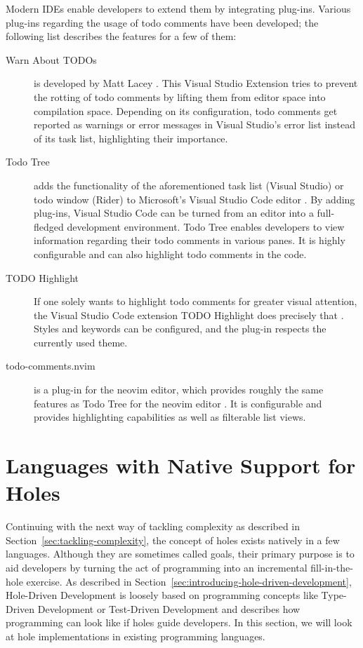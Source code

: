 Modern IDEs enable developers to extend them by integrating plug-ins.
Various plug-ins regarding the usage of todo comments have been developed; the following list describes the features for a few of them:
\begin{description}
  \item[Warn About TODOs] is developed by Matt Lacey \cite{lacey_warn_2023}. This Visual Studio Extension tries to prevent the rotting of todo comments by lifting them from editor space into compilation space. Depending on its configuration, todo comments get reported as warnings or error messages in Visual Studio's error list instead of its task list, highlighting their importance.
  \item[Todo Tree] adds the functionality of the aforementioned task list (Visual Studio) or todo window (Rider) to Microsoft's Visual Studio Code editor \cite{scott_todo_2017}. By adding plug-ins, Visual Studio Code can be turned from an editor into a full-fledged development environment. Todo Tree enables developers to view information regarding their todo comments in various panes. It is highly configurable and can also highlight todo comments in the code.
  \item[TODO Highlight] If one solely wants to highlight todo comments for greater visual attention, the Visual Studio Code extension TODO Highlight does precisely that \cite{wayou_vscode_2016}. Styles and keywords can be configured, and the plug-in respects the currently used theme.
  \item[todo-comments.nvim] is a plug-in for the neovim editor, which provides roughly the same features as Todo Tree for the neovim editor \cite{lemaitre_todo_2021}. It is configurable and provides highlighting capabilities as well as filterable list views.
\end{description}


\section{Languages with Native Support for Holes}
\label{sec:languages-with-native-holes-support}
Continuing with the next way of tackling complexity as described in Section~\ref{sec:tackling-complexity}, the concept of holes exists natively in a few languages.
Although they are sometimes called goals, their primary purpose is to aid developers by turning the act of programming into an incremental fill-in-the-hole exercise.
As described in Section~\ref{sec:introducing-hole-driven-development}, Hole-Driven Development is loosely based on programming concepts like Type-Driven Development \cite{brady_type-driven_2017} or Test-Driven Development \cite{mccracken_digital_1957} and describes how programming can look like if holes guide developers.
In this section, we will look at hole implementations in existing programming languages.

